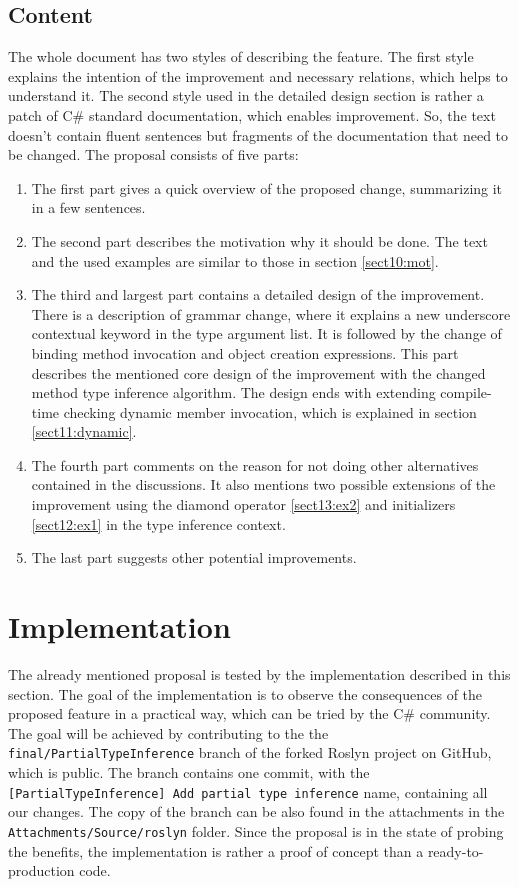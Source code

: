 \subsection{Content}

The whole document has two styles of describing the feature. 
The first style explains the intention of the improvement and necessary relations, which helps to understand it. 
The second style used in the detailed design section is rather a patch of C\# standard documentation, which enables improvement. 
So, the text doesn’t contain fluent sentences but fragments of the documentation that need to be changed.
The proposal consists of five parts:

\begin{enumerate}
  \item The first part gives a quick overview of the proposed change, summarizing it in a few sentences.
  \item The second part describes the motivation why it should be done. 
The text and the used examples are similar to those in section \ref{sect10:mot}.
  \item The third and largest part contains a detailed design of the improvement. 
There is a description of grammar change, where it explains a new underscore contextual keyword in the type argument list. 
It is followed by the change of binding method invocation and object creation expressions. 
This part describes the mentioned core design of the improvement with the changed method type inference algorithm. 
The design ends with extending compile-time checking dynamic member invocation, which is explained in section \ref{sect11:dynamic}.
  \item The fourth part comments on the reason for not doing other alternatives contained in the discussions. 
It also mentions two possible extensions of the improvement using the diamond operator \ref{sect13:ex2} and initializers \ref{sect12:ex1} in the type inference context.
 \item The last part suggests other potential improvements.
\end{enumerate}

\section{Implementation}

The already mentioned proposal is tested by the implementation described in this section. 
The goal of the implementation is to observe the consequences of the proposed feature in a practical way, which can be tried by the C\# community. 
The goal will be achieved by contributing to the the \texttt{final/PartialTypeInference} branch \cite{online:roslynFork} of the forked Roslyn project on GitHub, which is public.
The branch contains one commit, with the\\ \texttt{[PartialTypeInference] Add partial type inference} name, containing all our changes.
The copy of the branch can be also found in the attachments in the \texttt{Attachments/Source/roslyn} folder. 
Since the proposal is in the state of probing the benefits, the implementation is rather a proof of concept than a ready-to-production code.

